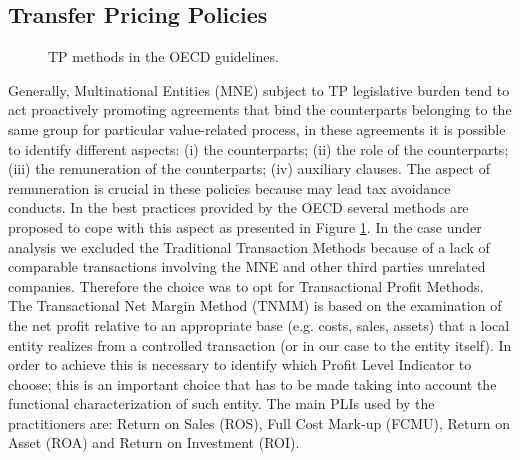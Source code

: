 \documentclass[conference,final,a4paper]{IEEEtran}
\begin{document}
\pagebreak

\hypertarget{transfer-pricing}{%
\subsection{Transfer Pricing Policies}\label{the-model}}
\begin{figure}
\centering
{}
\caption{TP methods in the OECD guidelines.} \label{fig:tp-m}
\end{figure}

Generally, Multinational Entities (MNE) subject to TP legislative burden tend to act proactively promoting agreements that bind the counterparts belonging to the same group for particular value-related process, in these agreements it is possible to identify different aspects: (i) the counterparts; (ii) the role of the counterparts; (iii) the remuneration of the counterparts; (iv) auxiliary clauses. The aspect of remuneration is crucial in these policies because may lead tax avoidance conducts. In the best practices provided by the OECD\cite{oecd17} several methods are proposed to cope with this aspect as presented in Figure \ref{fig:tp-m}. In the case under analysis we excluded the Traditional Transaction Methods because of a lack of comparable transactions involving the MNE and other third parties unrelated companies. Therefore the choice was to opt for Transactional Profit Methods. The Transactional Net Margin Method (TNMM) is based on the examination of the net profit relative to an appropriate base (e.g. costs, sales, assets) that a local entity realizes from a controlled transaction (or in our case to the entity itself). In order to achieve this is necessary to identify which Profit Level Indicator to choose; this is an important choice that has to be made taking into account the functional characterization of such entity. The main PLIs used by the practitioners are: Return on Sales (ROS), Full Cost Mark-up (FCMU), Return on Asset (ROA) and Return on Investment (ROI).
\end{document}
